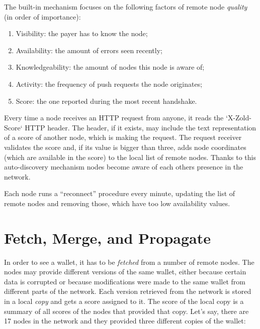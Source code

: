 \documentclass[11pt,oneside]{article}
\begin{document}
The built-in mechanism focuses on the following factors of
remote node \emph{quality} (in order of importance):

\begin{enumerate}
  \item Visibility: the payer has to know the node;
  \item Availability: the amount of errors seen recently;
  \item Knowledgeability: the amount of nodes this node is aware of;
  \item Activity: the frequency of push requests the node originates;
  \item Score: the one reported during the most recent handshake.
\end{enumerate}

Every time a node receives an HTTP request from anyone, it reads the
`X-Zold-Score` HTTP header. The header, if it exists, may include
the text representation of a score of another node, which is making
the request. The request receiver validates the score and, if its
value is bigger than three, adds node coordinates (which are
available in the score) to the local list of remote nodes. Thanks to this
auto-discovery mechanism nodes become aware of each others presence
in the network.

Each node runs a ``reconnect'' procedure every minute, updating the list
of remote nodes and removing those, which have too low availability values.

\section{Fetch, Merge, and Propagate}\label{sec:fetch}

In order to see a wallet, it has to be \emph{fetched} from a number of remote
nodes. The nodes may provide different versions of the same wallet, either
because certain data is corrupted or because modifications were made to the same
wallet from different parts of the network. Each version retrieved from the
network is stored in a local \emph{copy} and gets a score assigned to it.
The score of the local copy is a summary of all scores of the nodes that
provided that copy. Let's say, there are 17 nodes in the network and they
provided three different copies of the wallet:
\end{document}
